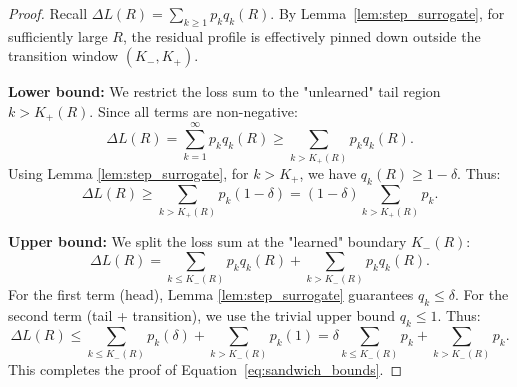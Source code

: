 \documentclass[10pt,a4paper]{amsart}
\begin{document}
\begin{proof}
Recall $\Delta L(R)=\sum_{k\ge 1} p_k q_k(R)$.
By Lemma~\ref{lem:step_surrogate}, for sufficiently large $R$, the residual profile is effectively pinned down outside the transition window $(K_-, K_+)$.

\textbf{Lower bound:}
We restrict the loss sum to the "unlearned" tail region $k > K_{+}(R)$. Since all terms are non-negative:
\[
\Delta L(R) = \sum_{k=1}^\infty p_k q_k(R) \ge \sum_{k>K_{+}(R)} p_k q_k(R).
\]
Using Lemma \ref{lem:step_surrogate}, for $k > K_+$, we have $q_k(R) \ge 1-\delta$. Thus:
\[
\Delta L(R) \ge \sum_{k>K_{+}(R)} p_k (1-\delta) = (1-\delta)\sum_{k>K_{+}(R)} p_k.
\]

\textbf{Upper bound:}
We split the loss sum at the "learned" boundary $K_{-}(R)$:
\[
\Delta L(R) = \sum_{k\le K_{-}(R)} p_k q_k(R) + \sum_{k>K_{-}(R)} p_k q_k(R).
\]
For the first term (head), Lemma \ref{lem:step_surrogate} guarantees $q_k \le \delta$. For the second term (tail + transition), we use the trivial upper bound $q_k \le 1$. Thus:
\[
\Delta L(R) \le \sum_{k\le K_{-}(R)} p_k (\delta) + \sum_{k>K_{-}(R)} p_k (1) = \delta\sum_{k\le K_{-}(R)} p_k + \sum_{k>K_{-}(R)} p_k.
\]
This completes the proof of Equation~\eqref{eq:sandwich_bounds}.
\end{proof}
\end{document}
